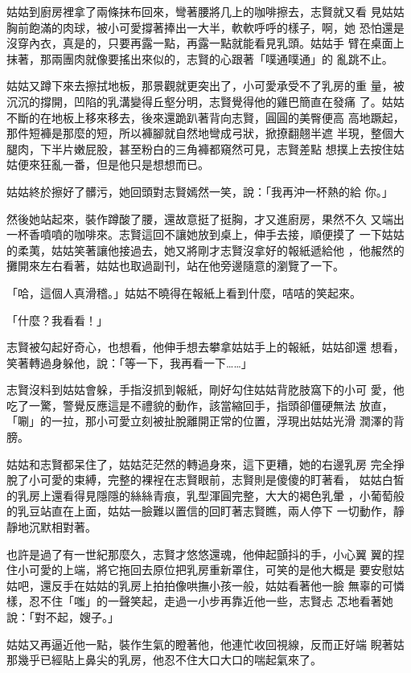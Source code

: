姑姑到廚房裡拿了兩條抹布回來，彎著腰將几上的咖啡擦去，志賢就又看
見姑姑胸前飽滿的肉球，被小可愛撐著捧出一大半，軟軟呼呼的樣子，啊，她
恐怕還是沒穿內衣，真是的，只要再露一點，再露一點就能看見乳頭。姑姑手
臂在桌面上抹著，那兩團肉就像要搖出來似的，志賢的心跟著「噗通噗通」的
亂跳不止。

姑姑又蹲下來去擦拭地板，那景觀就更突出了，小可愛承受不了乳房的重
量，被沉沉的撐開，凹陷的乳溝變得丘壑分明，志賢覺得他的雞巴簡直在發痛
了。姑姑不斷的在地板上移來移去，後來還跪趴著背向志賢，圓圓的美臀便高
高地蹶起，那件短褲是那麼的短，所以褲腳就自然地彎成弓狀，掀撩翻翹半遮
半現，整個大腿肉，下半片嫩屁股，甚至粉白的三角褲都窺然可見，志賢差點
想撲上去按住姑姑便來狂亂一番，但是他只是想想而已。

姑姑終於擦好了髒污，她回頭對志賢嫣然一笑，說：「我再沖一杯熱的給
你。」

然後她站起來，裝作蹲酸了腰，還故意挺了挺胸，才又進廚房，果然不久
又端出一杯香噴噴的咖啡來。志賢這回不讓她放到桌上，伸手去接，順便摸了
一下姑姑的柔荑，姑姑笑著讓他接過去，她又將剛才志賢沒拿好的報紙遞給他
，他赧然的攤開來左右看著，姑姑也取過副刊，站在他旁邊隨意的瀏覽了一下。

「哈，這個人真滑稽。」姑姑不曉得在報紙上看到什麼，咭咭的笑起來。

「什麼？我看看！」

志賢被勾起好奇心，也想看，他伸手想去攀拿姑姑手上的報紙，姑姑卻還
想看，笑著轉過身躲他，說：「等一下，我再看一下……」

志賢沒料到姑姑會躲，手指沒抓到報紙，剛好勾住姑姑背肐肢窩下的小可
愛，他吃了一驚，警覺反應這是不禮貌的動作，該當縮回手，指頭卻僵硬無法
放直，「唰」的一拉，那小可愛立刻被扯脫離開正常的位置，浮現出姑姑光滑
潤澤的背膀。

姑姑和志賢都呆住了，姑姑茫茫然的轉過身來，這下更糟，她的右邊乳房
完全掙脫了小可愛的束縛，完整的裸裎在志賢眼前，志賢則是傻傻的盯著看，
姑姑白皙的乳房上還看得見隱隱的絲絲青痕，乳型渾圓完整，大大的褐色乳暈
，小葡萄般的乳豆站直在上面，姑姑一臉難以置信的回盯著志賢瞧，兩人停下
一切動作，靜靜地沉默相對著。

也許是過了有一世紀那麼久，志賢才悠悠還魂，他伸起顫抖的手，小心翼
翼的捏住小可愛的上端，將它拖回去原位把乳房重新罩住，可笑的是他大概是
要安慰姑姑吧，還反手在姑姑的乳房上拍拍像哄撫小孩一般，姑姑看著他一臉
無辜的可憐樣，忍不住「嗤」的一聲笑起，走過一小步再靠近他一些，志賢忐
忑地看著她說：「對不起，嫂子。」

姑姑又再逼近他一點，裝作生氣的瞪著他，他連忙收回視線，反而正好端
睨著姑那幾乎已經貼上鼻尖的乳房，他忍不住大口大口的喘起氣來了。

